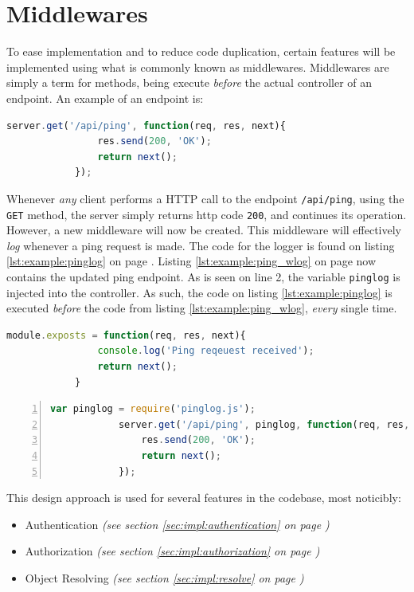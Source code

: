 	
	\section{Middlewares}
		To ease implementation and to reduce code duplication, certain features will be implemented using what is commonly known as middlewares. Middlewares are simply a term for methods, being execute \emph{before} the actual controller of an endpoint. An example of an endpoint is:
		\begin{lstlisting}[gobble=12,language=JavaScript]
            server.get('/api/ping', function(req, res, next){
                res.send(200, 'OK');
                return next();
            });		
		\end{lstlisting}

		Whenever \emph{any} client performs a HTTP call to the endpoint \verb=/api/ping=, using the \verb=GET= method, the server simply returns http code \verb=200=, and continues its operation. However, a new middleware will now be created. This middleware will effectively \emph{log} whenever a ping request is made. The code for the logger is found on listing \ref{lst:example:pinglog} on page \pageref{lst:example:pinglog}. Listing \ref{lst:example:ping_wlog} on page \pageref{lst:example:ping_wlog} now contains the updated ping endpoint. As is seen on line 2, the variable \verb=pinglog= is injected into the controller. As such, the code on listing \ref{lst:example:pinglog} is executed \emph{before} the code from listing \ref{lst:example:ping_wlog}, \emph{every} single time.

		\begin{lstlisting}[gobble=12,language=JavaScript,caption={PingLog Middleware},label={lst:example:pinglog}]
            module.exposts = function(req, res, next){
                console.log('Ping reqeuest received');
                return next();
            }
		\end{lstlisting}

		\begin{lstlisting}[gobble=12,language=JavaScript,caption={Ping endpoint with the pinglog middleware},numbers=left,label={lst:example:ping_wlog}]
            var pinglog = require('pinglog.js');
            server.get('/api/ping', pinglog, function(req, res, next){
                res.send(200, 'OK');
                return next();
            });		
		\end{lstlisting}

		This design approach is used for several features in the codebase, most noticibly:
		\begin{itemize}
			\item Authentication \emph{(see section \ref{sec:impl:authentication} on page \pageref{sec:impl:authentication})}
			\item Authorization \emph{(see section \ref{sec:impl:authorization} on page \pageref{sec:impl:authorization})}
			\item Object Resolving \emph{(see section \ref{sec:impl:resolve} on page \pageref{sec:impl:resolve})}
		\end{itemize}


